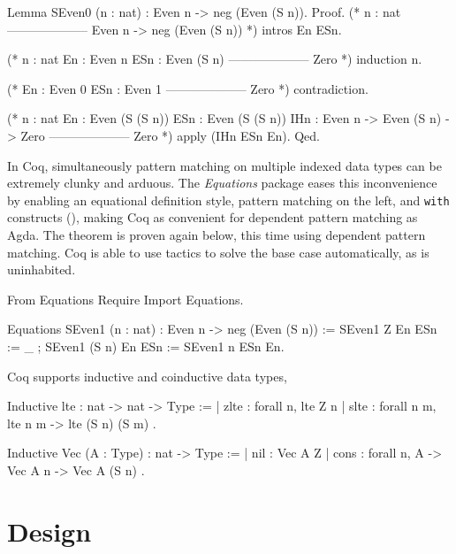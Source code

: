 \documentclass{mproj}
\begin{document}
\begin{coq}
    Lemma SEven0 (n : nat) : Even n -> neg (Even (S n)).
    Proof.
      (* n : nat
         --------------------
         Even n -> neg (Even (S n)) *)
      intros En ESn.

      (* n : nat 
         En : Even n
         ESn : Even (S n)
         --------------------
         Zero *)
      induction n.

      (* En : Even 0
         ESn : Even 1
         --------------------
         Zero *)
      contradiction.

      (* n : nat
         En : Even (S (S n))
         ESn : Even (S (S n))
         IHn : Even n -> Even (S n) -> Zero
         --------------------
         Zero *)
      apply (IHn ESn En).
    Qed.
\end{coq}

In Coq, simultaneously pattern matching on multiple indexed data types can be extremely clunky and arduous. The \emph{Equations} package eases this inconvenience by enabling an equational definition style, pattern matching on the left, and \texttt{with} constructs (\cite{McBride2004}), making Coq as convenient for dependent pattern matching as Agda. The theorem  is proven again below, this time using dependent pattern matching. Coq is able to use tactics to solve the base case automatically, as  is uninhabited.

\begin{coq}
    From Equations Require Import Equations.

    Equations SEven1 (n : nat) : Even n -> neg (Even (S n)) := {
    SEven1 Z     En ESn := _ ;
    SEven1 (S n) En ESn := SEven1 n ESn En}.
\end{coq}

Coq supports inductive and coinductive data types,

\begin{coq}
    Inductive lte : nat -> nat -> Type :=
    | zlte : forall {n}, lte Z n
    | slte : forall {n m}, lte n m -> lte (S n) (S m)
    .

    Inductive Vec (A : Type) : nat -> Type :=
    | nil  : Vec A Z
    | cons : forall {n}, A -> Vec A n -> Vec A (S n)
    .
\end{coq}

\chapter{Design}\label{design}
\end{document}
